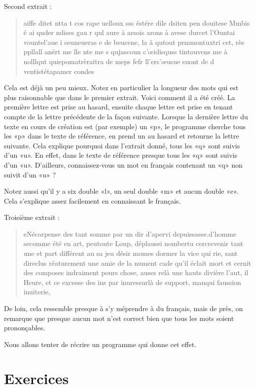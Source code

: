 Second extrait :
\begin{quote}
    aiffe ditet ntta t cos rape uelloux sss éstére dile dsiten pen douitese Mmbis é ai quder ndises gau r qul aure à arsois arons à avese durcet l'Ountai vountel'aue i seuneueras e de beucene, la à qutout prmmontuxtri cet, rès ppllall anért me lle nte me s qujascoun c'œidisquss tintouvens me à nolllqut quiepomatrèraitra de meps fefr ll'ers'œusue suont de d ventistétapamer condes
\end{quote}
Cela est déjà un peu mieux. Notez en particulier la longueur des mots qui est plus raisonnable que dans le premier extrait. Voici comment il a été créé. La première lettre est prise au hasard, ensuite chaque lettre est prise en tenant compte de la lettre précédente de la façon suivante. Lorsque la dernière lettre du texte en cours de création est (par exemple) un «p», le programme cherche tous les «p» dans le texte de référence, en prend un au hasard et retourne la lettre suivante. Cela explique pourquoi dans l'extrait donné, tous les «q» sont suivis d'un «u». En effet, dans le texte de référence presque tous les «q» sont suivis d'un «u». D'ailleurs, connaissez-vous un mot en français contenant un «q» non suivit d'un «u» ?

Notez aussi qu'il y a six double «l», un seul double «m» et aucun double «e». Cela s'explique assez facilement en connaissant le français.

Troisième extrait :
\begin{quote}
    eNécarpense des tant somme par un dir d'apervi depuissasse.d'homme secomme été en art, peutoute Loup, déplaussi nombertu cercrevenir tant une et part différent au sa jeu désir momes dormer la vice qui rie, sant direclus réaturement une amie de la nument cade qu'il éclait mort et cernit des composes indraiment pours chose, auses relà une hauts divière l'aut, il Heure, et ce excesse des ins par inuressurlà de support, manqui faussion inuiterie,
\end{quote}
De loin, cela ressemble presque à s'y méprendre à du français, mais de près, on remarque que presque aucun mot n'est correct bien que tous les mots soient prononçables.

Nous allons tenter de récrire un programme qui donne cet effet.


\section{Exercices}

